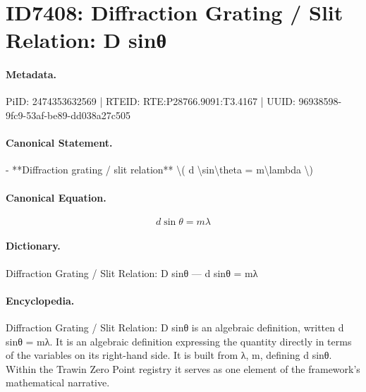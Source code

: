 \section*{ID7408: Diffraction Grating / Slit Relation: D sinθ}
\paragraph{Metadata.}
PiID: 2474353632569 | RTEID: RTE:P28766.9091:T3.4167 | UUID: 96938598-9fc9-53af-be89-dd038a27c505

\paragraph{Canonical Statement.}
- **Diffraction grating / slit relation** \textbackslash{}( d \textbackslash{}sin\textbackslash{}theta = m\textbackslash{}lambda \textbackslash{})

\paragraph{Canonical Equation.}
\[
d \sin\theta = m\lambda
\]

\paragraph{Dictionary.}
Diffraction Grating / Slit Relation: D sinθ — d sinθ = mλ

\paragraph{Encyclopedia.}
Diffraction Grating / Slit Relation: D sinθ is an algebraic definition, written d sinθ = mλ. It is an algebraic definition expressing the quantity directly in terms of the variables on its right-hand side. It is built from λ, m, defining d sinθ. Within the Trawin Zero Point registry it serves as one element of the framework's mathematical narrative.
